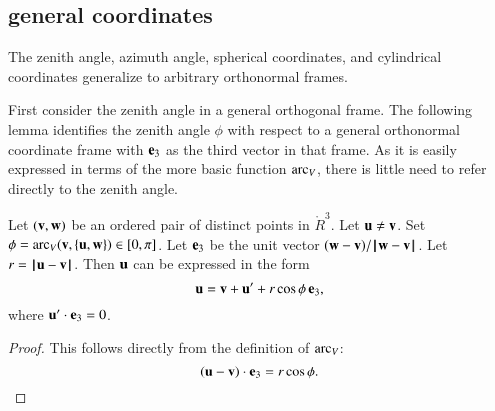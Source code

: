 \subsection{general coordinates}

%
The zenith angle, azimuth angle,
spherical coordinates, and cylindrical coordinates 
generalize to arbitrary orthonormal frames.

First consider the zenith angle in a general orthogonal frame.
The following lemma identifies the zenith angle $\phi$ with respect to
a general orthonormal coordinate frame with ${\mathbf e}_3$ as the third
vector in that frame.  As it is easily expressed in terms
of the more basic function $\operatorname{arc}_V$, 
there is little need to refer directly to the zenith angle.
%

\begin{lemma}[zenith]
Let $({\mathbf v},{\mathbf w})$ be an ordered pair of distinct points in $\ring{R}^3$.
Let ${\mathbf u}\ne {\mathbf v}$.  Set $\phi = \operatorname{arc}_V({\mathbf v},\{{\mathbf u},{\mathbf w}\})\in[0,\pi]$.
Let ${\mathbf e}_3$ be the unit vector $({\mathbf w}-{\mathbf v})/{\hskip0.1em|\hskip-0.15em|\hskip0.1em}{\mathbf w} - {\mathbf v}{\hskip0.1em|\hskip-0.15em|\hskip0.1em}$.  Let $r = {\hskip0.1em|\hskip-0.15em|\hskip0.1em}{\mathbf u} - {\mathbf v}{\hskip0.1em|\hskip-0.15em|\hskip0.1em}$.
Then ${\mathbf u}$
can be expressed in the form
   $$
   {\mathbf u} = {\mathbf v} + {\mathbf u}' +
   r\cos\phi\, {\mathbf e}_3,
   $$
where ${\mathbf u}'\cdot {\mathbf e}_3 = 0$.
%
%
%
\end{lemma}

\begin{proof} This follows directly from the definition of $\operatorname{arc}_V$:
  $$({\mathbf u}-{\mathbf v})\cdot {\mathbf e}_3 = r\cos\phi.$$
\end{proof}




